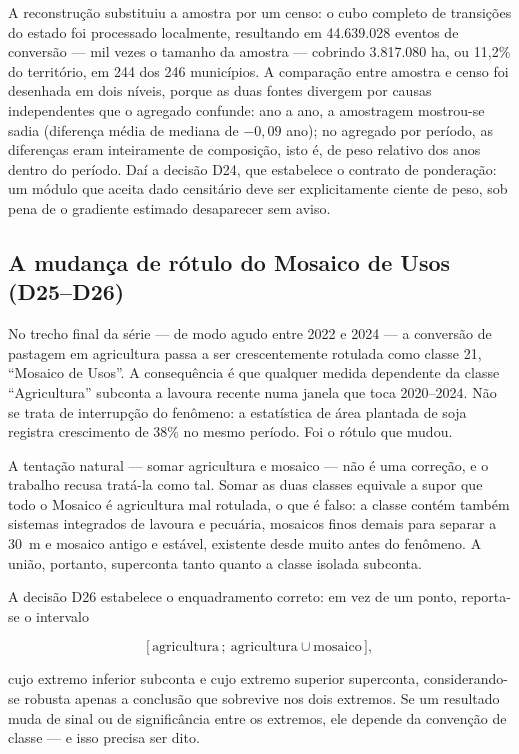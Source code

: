 A reconstrução substituiu a amostra por um censo: o cubo completo de
transições do estado foi processado localmente, resultando em 44.639.028
eventos de conversão --- mil vezes o tamanho da amostra --- cobrindo
3.817.080 ha, ou 11,2\% do território, em 244 dos 246 municípios. A
comparação entre amostra e censo foi desenhada em dois níveis, porque as
duas fontes divergem por causas independentes que o agregado confunde: ano a
ano, a amostragem mostrou-se sadia (diferença média de mediana de $-0{,}09$
ano); no agregado por período, as diferenças eram inteiramente de
composição, isto é, de peso relativo dos anos dentro do período. Daí a
decisão D24, que estabelece o contrato de ponderação: um módulo que aceita
dado censitário deve ser explicitamente ciente de peso, sob pena de o
gradiente estimado desaparecer sem aviso.

\subsection{A mudança de rótulo do Mosaico de Usos (D25--D26)}
\label{ap:d25}

No trecho final da série --- de modo agudo entre 2022 e 2024 --- a conversão
de pastagem em agricultura passa a ser crescentemente rotulada como classe
21, ``Mosaico de Usos''. A consequência é que qualquer medida dependente da
classe ``Agricultura'' subconta a lavoura recente numa janela que toca
2020--2024. Não se trata de interrupção do fenômeno: a estatística de área
plantada de soja registra crescimento de 38\% no mesmo período. Foi o rótulo
que mudou.

A tentação natural --- somar agricultura e mosaico --- não é uma correção,
e o trabalho recusa tratá-la como tal. Somar as duas classes equivale a
supor que todo o Mosaico é agricultura mal rotulada, o que é falso: a classe
contém também sistemas integrados de lavoura e pecuária, mosaicos finos
demais para separar a 30~m e mosaico antigo e estável, existente desde muito
antes do fenômeno. A união, portanto, superconta tanto quanto a classe
isolada subconta.

A decisão D26 estabelece o enquadramento correto: em vez de um ponto,
reporta-se o intervalo

\begin{equation*}
\big[\,\text{agricultura}\,;\ \text{agricultura} \cup \text{mosaico}\,\big],
\end{equation*}

\noindent cujo extremo inferior subconta e cujo extremo superior superconta,
considerando-se robusta apenas a conclusão que sobrevive nos dois extremos. Se um resultado muda de sinal ou de significância entre os
extremos, ele depende da convenção de classe --- e isso precisa ser dito.

